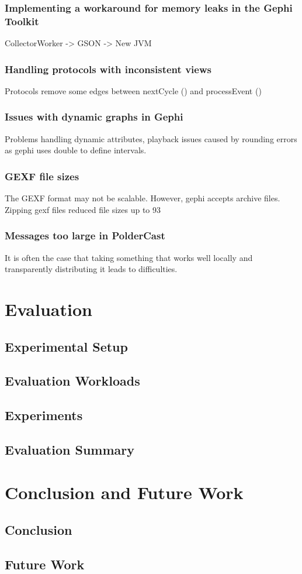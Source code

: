 \documentclass[UKenglish, a4paper]{ifimaster}
\begin{document}
    \subsection{Implementing a workaround for memory leaks in the Gephi Toolkit}
    CollectorWorker -> GSON -> New JVM
    \subsection{Handling protocols with inconsistent views}
    Protocols remove some edges between nextCycle () and processEvent ()
    \subsection{Issues with dynamic graphs in Gephi}
        Problems handling dynamic attributes, playback issues caused by
        rounding errors as gephi uses double to define intervals.
    \subsection{GEXF file sizes}
        The GEXF format may not be scalable. However, gephi accepts
        archive files. Zipping gexf files reduced file sizes up to 93%
    \subsection{Messages too large in PolderCast}
        It is often the case that taking something that works well
        locally and transparently distributing it leads to difficulties.

\chapter{Evaluation}
\label{ch:evaluation}
    \section{Experimental Setup}
    \section{Evaluation Workloads}
    \section{Experiments}
    \section{Evaluation Summary}

\chapter{Conclusion and Future Work}
\label{ch:conclusion-and-future-work}
    \section{Conclusion}
    \section{Future Work}


\backmatter{}
\printbibliography{}
\end{document}
